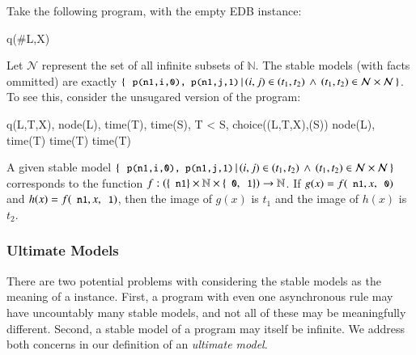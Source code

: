 \begin{example}
\label{ex:uncountable}
Take the following \lang program, with the empty EDB instance:

\begin{Drules}
        {q(#L,X)}
\end{Drules}

Let $\mathcal{N}$ represent the set of all infinite subsets of $\mathbb{N}$.
The stable models (with  facts ommitted) are exactly $\{ \, \dedalus{p(n1,i,0), p(n1,j,1)} \, | \, (i,j) \in (t_1, t_2) \, \land \, (t_1, t_2) \in \mathcal{N}
\times \mathcal{N} \, \}$.  To see this, consider the unsugared version of the program:

\begin{Drules}
        {q(L,T,X), node(L), time(T), time(S), T < S, choice((L,T,X),(S))}
        {node(L), time(T)}
        {time(T)}
        {time(T)}
\end{Drules}

A given stable model $\{ \, \dedalus{p(n1,i,0), p(n1,j,1)} \, | \, (i,j)\in (t_1, t_2) \, \land \, (t_1, t_2)\in \mathcal{N}                                                    
\times \mathcal{N} \, \}$ corresponds to the function $f : \left(\{\dedalus{n1}\} \times \mathbb{N} \times \{\dedalus{0},\dedalus{1}\}\right) \rightarrow \mathbb{N}$.  If $g(x) = f(\dedalus{n1}, x, \dedalus{0})$ and $h(x) = f(\dedalus{n1}, x, \dedalus{1})$, then the image of $g(x)$ is $t_1$ and the image of $h(x)$ is $t_2$.
\end{example}



\subsubsection{Ultimate Models}
There are two potential problems with considering the stable models as the meaning of a \lang instance.  
First, a program with even one asynchronous rule may have uncountably many stable models, and not all of these may be meaningfully different.  Second, a stable model of a \lang program may itself be infinite.    We address both concerns in our definition of an {\em ultimate model}.

